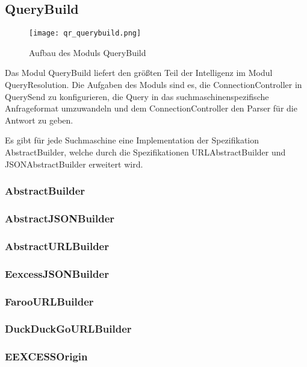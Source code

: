 
\subsection{QueryBuild}

\begin{figure}[htb]
  \texttt{[image: qr\_querybuild.png]}
  \caption{Aufbau des Moduls QueryBuild}
	\label{fig:Aufbau des Moduls QueryBuild}
\end{figure}

Das Modul QueryBuild liefert den größten Teil der Intelligenz im Modul QueryResolution. Die Aufgaben des Moduls sind es, die ConnectionController in QuerySend zu konfigurieren, die Query in das suchmaschinenspezifische Anfrageformat umzuwandeln und dem ConnectionController den Parser für die Antwort zu geben.

Es gibt für jede Suchmaschine eine Implementation der Spezifikation AbstractBuilder, welche durch die Spezifikationen URLAbstractBuilder und JSONAbstractBuilder erweitert wird.

\subsubsection{AbstractBuilder}
\subsubsection{AbstractJSONBuilder}
\subsubsection{AbstractURLBuilder}
\subsubsection{EexcessJSONBuilder}
\subsubsection{FarooURLBuilder}
\subsubsection{DuckDuckGoURLBuilder}
\subsubsection{EEXCESSOrigin}

